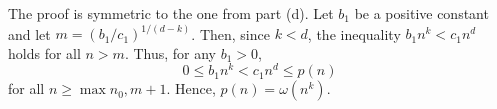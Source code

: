 The proof is symmetric to the one from part (d).
Let $b_1$ be a positive constant and let $m=(b_1/c_1)^{1/(d-k)}$.
Then, since $k<d$, the inequality $b_1n^k<c_1n^d$ holds for all $n>m$.
Thus, for any $b_1>0$,
\[
    0 \le b_1n^k < c_1n^d \le p(n)
\]
for all $n\ge\max{n_0,m+1}$.
Hence, $p(n)=\omega(n^k)$.
